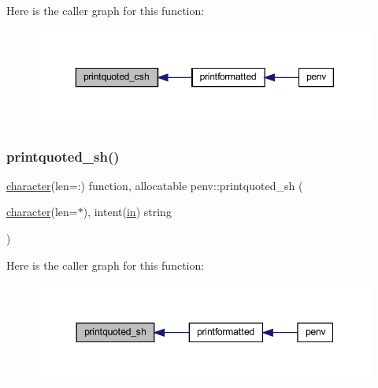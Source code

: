 Here is the caller graph for this function\+:
\nopagebreak
\begin{figure}[H]
\begin{center}
\leavevmode
\includegraphics[width=350pt]{penv_8f90_a8352a8cad3a618a85c981f11beb23715_icgraph}
\end{center}
\end{figure}
\mbox{\label{penv_8f90_a446969c8690f5c32006cd0ae899ce932}} 
\subsubsection{\texorpdfstring{printquoted\+\_\+sh()}{printquoted\_sh()}}
{\footnotesize\ttfamily \hyperlink{option__stopwatch_83_8txt_abd4b21fbbd175834027b5224bfe97e66}{character}(len=\+:) function, allocatable penv\+::printquoted\+\_\+sh (\begin{DoxyParamCaption}\item[{\hyperlink{option__stopwatch_83_8txt_abd4b21fbbd175834027b5224bfe97e66}{character}(len=$\ast$), intent(\hyperlink{M__journal_83_8txt_afce72651d1eed785a2132bee863b2f38}{in})}]{string }\end{DoxyParamCaption})}

Here is the caller graph for this function\+:
\nopagebreak
\begin{figure}[H]
\begin{center}
\leavevmode
\includegraphics[width=344pt]{penv_8f90_a446969c8690f5c32006cd0ae899ce932_icgraph}
\end{center}
\end{figure}
